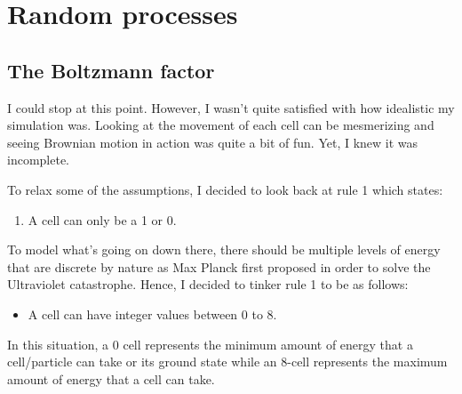\chapter{Random processes}
\section{The Boltzmann factor}
I could stop at this point. However, I wasn't quite satisfied with how idealistic my simulation was. Looking at the movement of each cell can be mesmerizing and seeing Brownian motion in action was quite a bit of fun. Yet, I knew it was incomplete. \par

\vspace{0.3cm}
To relax some of the assumptions, I decided to look back at rule 1 which states: 
\begin{enumerate}
    \item A cell can only be a 1 or 0.
\end{enumerate}
To model what's going on down there, there should be multiple levels of energy that are discrete by nature as Max Planck first proposed in order to solve the Ultraviolet catastrophe. Hence, I decided to tinker rule 1 to be as follows: 
\begin{itemize}
    \item A cell can have integer values between 0 to 8.
\end{itemize}
In this situation, a 0 cell represents the minimum amount of energy that a cell/particle can take or its ground state while an 8-cell represents the maximum amount of energy that a cell can take. \par

